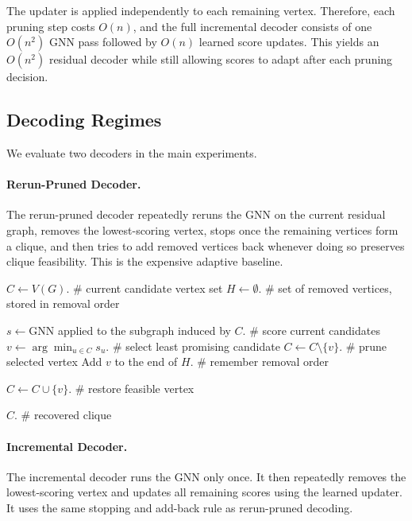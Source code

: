 The updater is applied independently to each remaining vertex. Therefore, each pruning step costs $O(n)$, and the full incremental decoder consists of one $O(n^2)$ GNN pass followed by $O(n)$ learned score updates. This yields an $O(n^2)$ residual decoder while still allowing scores to adapt after each pruning decision.

\subsection{Decoding Regimes}

We evaluate two decoders in the main experiments.

\paragraph{Rerun-Pruned Decoder.}
The rerun-pruned decoder repeatedly reruns the GNN on the current residual graph, removes the lowest-scoring vertex, stops once the remaining vertices form a clique, and then tries to add removed vertices back whenever doing so preserves clique feasibility. This is the expensive adaptive baseline.

\begin{algorithmic}[1]
  \State $C \leftarrow V(G)$. \# current candidate vertex set
  \State $H \leftarrow \emptyset$. \# set of removed vertices, stored in removal order

  \State $s \leftarrow \mathrm{GNN}$ applied to the subgraph induced by $C$. \# score current candidates
  \State $v \leftarrow \arg\min_{u\in C} s_u$. \# select least promising candidate
  \State $C \leftarrow C\setminus\{v\}$. \# prune selected vertex
  \State Add $v$ to the end of $H$. \# remember removal order
  \EndWhile

  \State $C \leftarrow C\cup\{v\}$. \# restore feasible vertex
  \EndIf
  \EndFor

  \State \Return $C$. \# recovered clique
\end{algorithmic}

\paragraph{Incremental Decoder.}
The incremental decoder runs the GNN only once. It then repeatedly removes the lowest-scoring vertex and updates all remaining scores using the learned updater. It uses the same stopping and add-back rule as rerun-pruned decoding.

